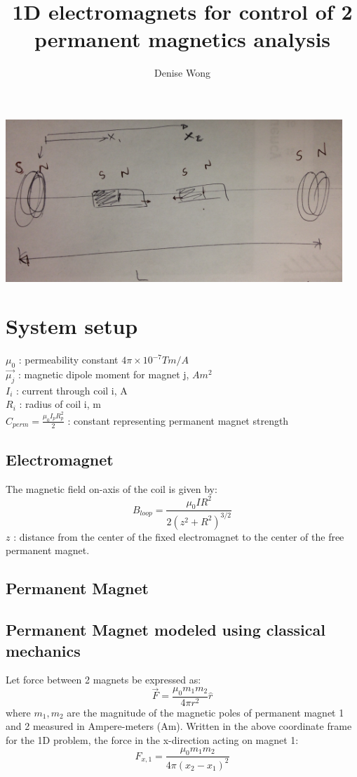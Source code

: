 \documentclass[english]{article}
\title{1D electromagnets for control of 2 permanent magnetics analysis}
\author{Denise Wong}
\begin{document}
\maketitle
\begin{center}
\includegraphics[width=5in]{1Dprobsetup.JPG}
\end{center}

\section{System setup}
$\mu_0$ : permeability constant $4\pi \times 10^{-7} Tm/A$\\
$\vec{\mu_j}$ : magnetic dipole moment for magnet j, $Am^2$\\
$I_i$ : current through coil i, A\\
$R_i$ : radius of coil i, m\\
$C_{perm} = \frac{\mu_0 I_p R_p^2}{2}$ : constant representing permanent magnet strength

\subsection{Electromagnet}
The magnetic field on-axis of the coil is given by:
$${B}_{loop} = \frac{\mu_0 I R^2}{2\left(z^2 + R^2\right)^{3/2}}$$
${z}$ : distance from the center of the fixed electromagnet to the center of the free permanent magnet.  

\subsection{Permanent Magnet}
\subsection*{Permanent Magnet modeled using classical mechanics}
Let force between 2 magnets be expressed as:
$$\vec{F} = \frac{\mu_0 m_1 m_2}{4 \pi r^2}\hat{r}$$
where $m_1,m_2$ are the magnitude of the magnetic poles of permanent magnet 1 and 2 measured in Ampere-meters (Am).  Written in the above coordinate frame for the 1D problem, the force in the x-direction acting on magnet 1:
$$F_{x,1} = \frac{\mu_0 m_1 m_2}{4 \pi \left(x_2-x_1\right)^2}$$
\end{document}
